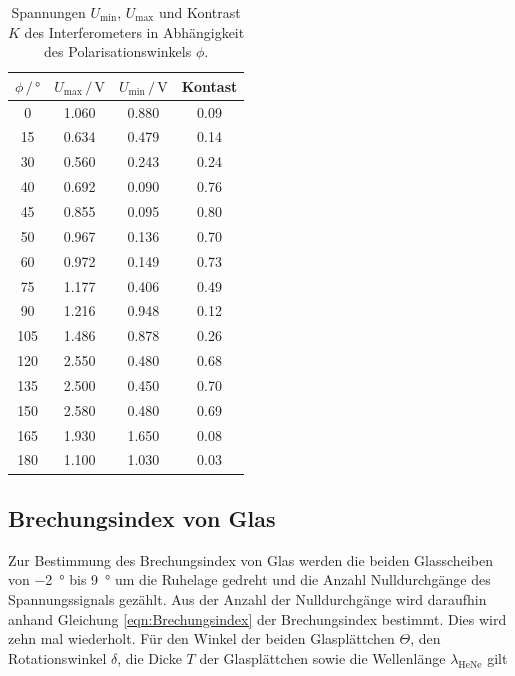 \begin{table}[H]
  \centering
  \caption{Spannungen $U_\text{min}$, $U_\text{max}$ und Kontrast $K$ des Interferometers in Abhängigkeit des Polarisationswinkels $\phi$.}
  \label{tab:Kontrast}
  \begin{tabular}{cccc}
    \toprule
    $\phi \, / \,  \si{\degree}$ & $U_\text{max} \, / \, \si{\volt}$ &  $U_\text{min} \, / \, \si{\volt}$ & Kontast \\
    \midrule
    0   & \num{1.060} &  \num{0.880} & \num{0.09} \\
    15  & \num{0.634} &  \num{0.479} & \num{0.14} \\
    30  & \num{0.560} &  \num{0.243} & \num{0.24} \\
    40  & \num{0.692} &  \num{0.090} & \num{0.76} \\
    45  & \num{0.855} &  \num{0.095} & \num{0.80} \\
    50  & \num{0.967} &  \num{0.136} & \num{0.70} \\
    60  & \num{0.972} &  \num{0.149} & \num{0.73} \\
    75  & \num{1.177} &  \num{0.406} & \num{0.49} \\
    90  & \num{1.216} &  \num{0.948} & \num{0.12} \\
    105 & \num{1.486} &  \num{0.878} & \num{0.26} \\
    120 & \num{2.550} &  \num{0.480} & \num{0.68} \\
    135 & \num{2.500} &  \num{0.450} & \num{0.70} \\
    150 & \num{2.580} &  \num{0.480} & \num{0.69} \\
    165 & \num{1.930} &  \num{1.650} & \num{0.08} \\
    180 & \num{1.100} &  \num{1.030} & \num{0.03} \\
    \bottomrule
  \end{tabular}
\end{table}


\subsection{Brechungsindex von Glas}

Zur Bestimmung des Brechungsindex von Glas werden die beiden Glasscheiben von \SI{-2}{\degree} bis \SI{9}{\degree} um die Ruhelage gedreht und die Anzahl Nulldurchgänge des Spannungssignals gezählt. Aus der Anzahl der Nulldurchgänge wird daraufhin anhand Gleichung \eqref{eqn:Brechungsindex} der Brechungsindex bestimmt. Dies wird zehn mal wiederholt. Für den Winkel der beiden Glasplättchen $\Theta$, den Rotationswinkel $\delta$, die Dicke $T$ der Glasplättchen sowie die Wellenlänge $\lambda_\text{HeNe}$ gilt

